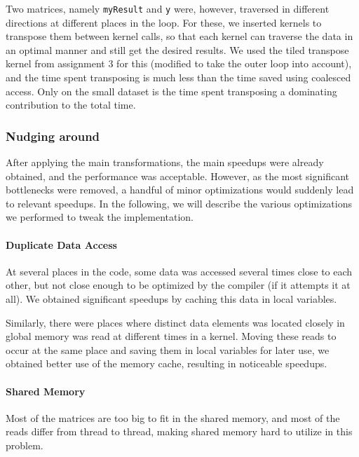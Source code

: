 \documentclass[11pt]{article}
\begin{document}
Two matrices, namely \texttt{myResult} and \texttt{y} were, however, traversed in different directions at different places in the loop.
For these, we inserted kernels to transpose them between kernel calls, so that each kernel can traverse the data in an optimal manner and still get the desired results.
We used the tiled transpose kernel from assignment 3 for this (modified to take the outer loop into account), and the time spent transposing is much less than the time saved using coalesced access.
Only on the small dataset is the time spent transposing a dominating contribution to the total time.


\subsubsection{Nudging around}

After applying the main transformations, the main speedups were already obtained, and the performance was acceptable.
However, as the most significant bottlenecks were removed, a handful of minor optimizations would suddenly lead to relevant speedups.
In the following, we will describe the various optimizations we performed to tweak the implementation.


\paragraph{Duplicate Data Access\\}
At several places in the code, some data was accessed several times close to each other, but not close enough to be optimized by the compiler (if it attempts it at all).
We obtained significant speedups by caching this data in local variables.

Similarly, there were places where distinct data elements was located closely in global memory was read at different times in a kernel.
Moving these reads to occur at the same place and saving them in local variables for later use, we obtained better use of the memory cache, resulting in noticeable speedups.

\paragraph{Shared Memory\\}
Most of the matrices are too big to fit in the shared memory, and most of the reads differ from thread to thread, making shared memory hard to utilize in this problem.
\end{document}
